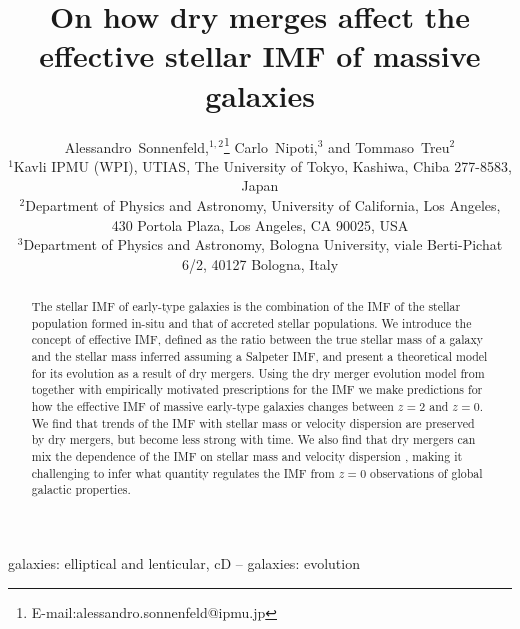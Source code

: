 \documentclass[usenatbib, letters]{mnras}
\begin{document}
\title{On how dry merges affect the effective stellar IMF of massive galaxies}
\author[Sonnenfeld et al.]{
Alessandro~Sonnenfeld,$^{1,2}$\thanks{E-mail:alessandro.sonnenfeld@ipmu.jp}
Carlo~Nipoti,$^{3}$
and Tommaso~Treu$^{2}$
\\
$^{1}$Kavli IPMU (WPI), UTIAS, The University of Tokyo, Kashiwa, Chiba 277-8583, Japan \\
$^{2}$Department of Physics and Astronomy, University of California, Los Angeles, 430 Portola Plaza, Los Angeles, CA 90025, USA \\
$^{3}$Department of Physics and Astronomy, Bologna University, viale Berti-Pichat 6/2, 40127 Bologna, Italy
}

\maketitle

\begin{abstract}
The stellar IMF of early-type galaxies is the combination of the IMF of the stellar population formed in-situ and that of accreted stellar populations.
We introduce the concept of effective IMF, defined as the ratio between the true stellar mass of a galaxy and the stellar mass inferred assuming a Salpeter IMF, and present a theoretical model for its evolution as a result of dry mergers.
Using the dry merger evolution model from \citet{Nip++12} together with empirically motivated prescriptions for the IMF we make predictions for how the effective IMF of massive early-type galaxies changes between $z=2$ and $z=0$.
We find that trends of the IMF with stellar mass or velocity dispersion are preserved by dry mergers, but become less strong with time.
We also find that dry mergers can mix the dependence of the IMF on stellar mass and velocity dispersion
, making it challenging to infer what quantity regulates the IMF from $z=0$ observations of global galactic properties.
\end{abstract}

\begin{keywords}
   galaxies: elliptical and lenticular, cD -- galaxies: evolution
\end{keywords}

\end{document}
